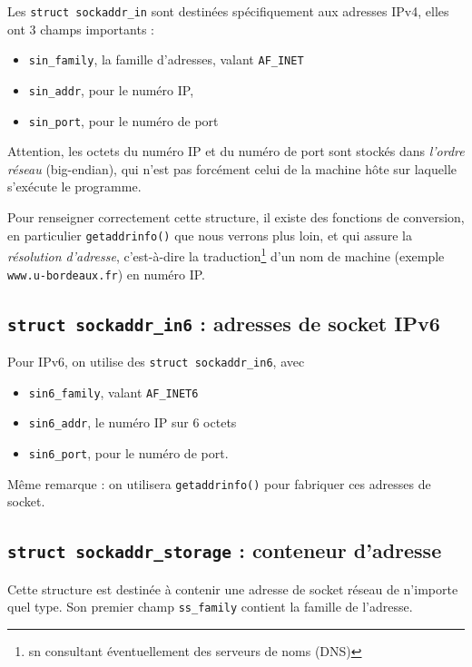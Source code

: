 Les \texttt{struct sockaddr\_in} sont destinées spécifiquement
aux adresses IPv4, elles ont 3 champs importants :
\begin{itemize}
\item \texttt{sin\_family}, la famille d'adresses, valant \texttt{AF\_INET}
\item \texttt{sin\_addr}, pour le numéro IP,
\item \texttt{sin\_port}, pour le numéro de port
\end{itemize}

Attention, les octets du numéro IP et du numéro de port sont
stockés dans \emph{l'ordre réseau} (big-endian), qui n'est pas forcément
celui de la machine hôte sur laquelle s'exécute le programme. 

Pour renseigner correctement cette structure, il existe des fonctions
de conversion, en particulier \texttt{getaddrinfo()} que nous verrons
plus loin, et qui assure la \emph{résolution d'adresse}, c'est-à-dire
la traduction\footnote{sn consultant éventuellement des serveurs de
  noms (DNS)} d'un nom de machine (exemple \texttt{www.u-bordeaux.fr})
en numéro IP.

\subsection{\texttt{struct sockaddr\_in6} : adresses de socket IPv6}


Pour IPv6, on utilise
des \texttt{struct sockaddr\_in6}, avec
\begin{itemize}
\item \texttt{sin6\_family}, valant \texttt{AF\_INET6}
\item \texttt{sin6\_addr}, le numéro IP sur 6 octets
\item \texttt{sin6\_port}, pour le numéro de port.
\end{itemize}

Même remarque : on utilisera \texttt{getaddrinfo()} pour fabriquer ces
adresses de socket.


\subsection{\texttt{struct sockaddr\_storage} : conteneur d'adresse}

Cette structure est destinée à contenir une adresse de socket réseau de
n'importe quel type. Son premier champ \texttt{ss\_family} contient la
famille de l'adresse.

